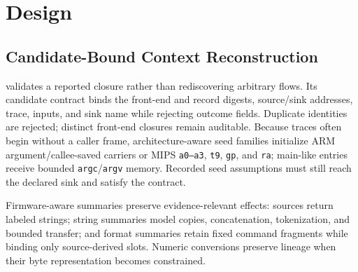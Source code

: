 \section{Design}
\label{sec:design}

\subsection{Candidate-Bound Context Reconstruction}
\label{sec:candidate-context}

\tool validates a reported closure rather than rediscovering arbitrary flows.
Its candidate contract binds the front-end and record digests, source/sink
addresses, trace, inputs, and sink name while rejecting outcome fields.
Duplicate identities are rejected; distinct front-end closures remain
auditable. Because traces often begin without a caller frame, architecture-aware
seed families initialize ARM argument/callee-saved carriers or MIPS
\texttt{a0--a3}, \texttt{t9}, \texttt{gp}, and \texttt{ra}; main-like entries
receive bounded \texttt{argc}/\texttt{argv} memory. Recorded seed assumptions
must still reach the declared sink and satisfy the contract.

Firmware-aware summaries preserve evidence-relevant effects: sources return
labeled strings; string summaries model copies, concatenation, tokenization,
and bounded transfer; and format summaries retain fixed command fragments while
binding only source-derived slots. Numeric conversions preserve lineage when
their byte representation becomes constrained.

